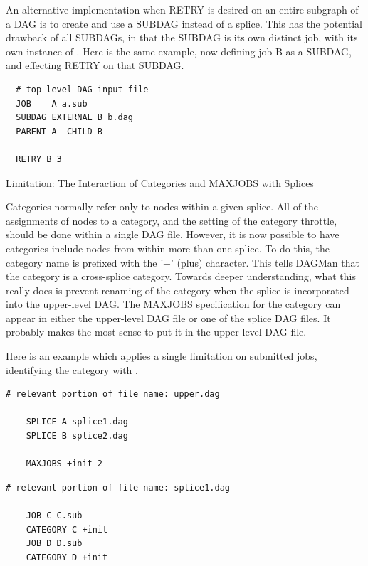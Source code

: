 An alternative implementation when RETRY is desired on an
entire subgraph of a DAG is to create and use a SUBDAG
instead of a splice.
This has the potential drawback of all SUBDAGs,
in that the SUBDAG is its own distinct job,
with its own instance of .
Here is the same example, now defining job B as a SUBDAG,
and effecting RETRY on that SUBDAG.
\begin{verbatim}
  # top level DAG input file
  JOB    A a.sub
  SUBDAG EXTERNAL B b.dag
  PARENT A  CHILD B

  RETRY B 3
\end{verbatim}

\begin{description}
\item[Limitation: The Interaction of Categories and MAXJOBS with Splices]
\end{description}

Categories normally refer only to nodes within a
given splice.
All of the assignments of nodes to a category, and the
setting of the category throttle, should be done within a single DAG file.
However, it is now possible to have categories include nodes
from within more than one splice.
To do this, the category name is prefixed with the '+' (plus) character.
This tells DAGMan that the category is
a cross-splice category.
Towards deeper understanding,
what this really does is prevent renaming
of the category when the splice is incorporated into the upper-level DAG.
The MAXJOBS specification for the category can appear in either the
upper-level DAG file or one of the splice DAG files.
It probably
makes the most sense to put it in the upper-level DAG file.

Here is an example which applies a single limitation on submitted jobs,
identifying the category with . 

\begin{verbatim}
# relevant portion of file name: upper.dag

    SPLICE A splice1.dag
    SPLICE B splice2.dag

    MAXJOBS +init 2
\end{verbatim}

\begin{verbatim}
# relevant portion of file name: splice1.dag

    JOB C C.sub
    CATEGORY C +init
    JOB D D.sub
    CATEGORY D +init

\end{verbatim}

